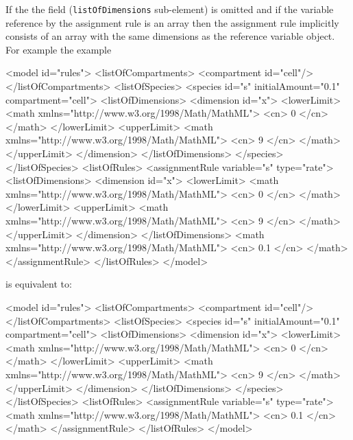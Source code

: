 \documentclass{cekarticle}
\begin{document}
If the the  field
(\texttt{listOfDimensions} sub-element) is omitted and if the variable reference by the
assignment rule is an array then the assignment rule implicitly consists of an array with the
same dimensions as the reference variable object.  For example the example

\begin{example}
<model id="rules">
    <listOfCompartments>
        <compartment id="cell"/>
    </listOfCompartments>
    <listOfSpecies>
        <species id="s" initialAmount="0.1" compartment="cell">
            <listOfDimensions>
                <dimension id="x">
                    <lowerLimit>
                        <math xmlns="http://www.w3.org/1998/Math/MathML">
                            <cn> 0 </cn>
                        </math>
                    </lowerLimit>
                    <upperLimit>
                        <math xmlns="http://www.w3.org/1998/Math/MathML">
                            <cn> 9 </cn>
                        </math>
                    </upperLimit>
                </dimension>
            </listOfDimensions>
        </species>
    </listOfSpecies>
    <listOfRules>
        <assignmentRule variable="s" type="rate">
            <listOfDimensions>
                <dimension id="x">
                    <lowerLimit>
                        <math xmlns="http://www.w3.org/1998/Math/MathML">
                            <cn> 0 </cn>
                        </math>
                    </lowerLimit>
                    <upperLimit>
                        <math xmlns="http://www.w3.org/1998/Math/MathML">
                            <cn> 9 </cn>
                        </math>
                    </upperLimit>
                </dimension>
            </listOfDimensions>
            <math xmlns="http://www.w3.org/1998/Math/MathML">
                <cn> 0.1 </cn>
            </math>
        </assignmentRule>
    </listOfRules>
</model>
\end{example}

is equivalent to:

\begin{example}
<model id="rules">
    <listOfCompartments>
        <compartment id="cell"/>
    </listOfCompartments>
    <listOfSpecies>
        <species id="s" initialAmount="0.1" compartment="cell">
            <listOfDimensions>
                <dimension id="x">
                    <lowerLimit>
                        <math xmlns="http://www.w3.org/1998/Math/MathML">
                            <cn> 0 </cn>
                        </math>
                    </lowerLimit>
                    <upperLimit>
                        <math xmlns="http://www.w3.org/1998/Math/MathML">
                            <cn> 9 </cn>
                        </math>
                    </upperLimit>
                </dimension>
            </listOfDimensions>
        </species>
    </listOfSpecies>
    <listOfRules>
        <assignmentRule variable="s" type="rate">
            <math xmlns="http://www.w3.org/1998/Math/MathML">
                <cn> 0.1 </cn>
            </math>
        </assignmentRule>
    </listOfRules>
</model>
\end{example}
\end{document}

